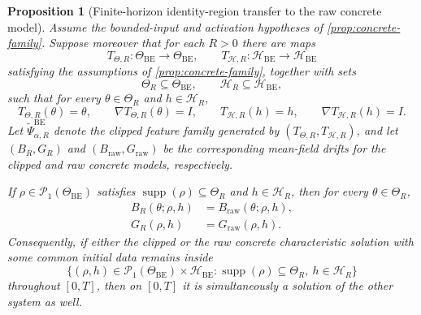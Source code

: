 \documentclass[11pt]{article}
\newtheorem{proposition}[theorem]{Proposition}
\theoremstyle{definition}
\newcommand{\PP}{\mathcal{P}}
\begin{document}
\begin{proposition}[Finite-horizon identity-region transfer to the raw concrete model]
\label{prop:identity-transfer}
Assume the bounded-input and activation hypotheses of
\cref{prop:concrete-family}. Suppose moreover that for each $R>0$ there are
maps
\[
  T_{\Theta,R}:\Theta_{\mathrm{BE}}\to\Theta_{\mathrm{BE}},
  \qquad
  T_{\mathcal H,R}:\mathcal H_{\mathrm{BE}}\to\mathcal H_{\mathrm{BE}}
\]
satisfying the assumptions of \cref{prop:concrete-family}, together with sets
\[
  \Theta_R\subseteq\Theta_{\mathrm{BE}},
  \qquad
  \mathcal H_R\subseteq\mathcal H_{\mathrm{BE}},
\]
such that for every $\theta\in\Theta_R$ and $h\in\mathcal H_R$,
\[
  T_{\Theta,R}(\theta)=\theta,
  \qquad
  \nabla T_{\Theta,R}(\theta)=I,
  \qquad
  T_{\mathcal H,R}(h)=h,
  \qquad
  \nabla T_{\mathcal H,R}(h)=I.
\]
Let $\widetilde\Psi_{\alpha,R}^{\mathrm{BE}}$ denote the clipped feature family
generated by $(T_{\Theta,R},T_{\mathcal H,R})$, and let
$(B_R,G_R)$ and $(B_{\mathrm{raw}},G_{\mathrm{raw}})$ be the corresponding
mean-field drifts for the clipped and raw concrete models, respectively.

If $\rho\in\PP_1(\Theta_{\mathrm{BE}})$ satisfies $\operatorname{supp}(\rho)\subseteq\Theta_R$
and $h\in\mathcal H_R$, then for every $\theta\in\Theta_R$,
\begin{align}
  B_R(\theta;\rho,h)
  &= B_{\mathrm{raw}}(\theta;\rho,h),
  \label{eq:transfer-B}\\
  G_R(\rho,h)
  &= G_{\mathrm{raw}}(\rho,h).
  \label{eq:transfer-G}
\end{align}
Consequently, if either the clipped or the raw concrete characteristic
solution with some common initial data remains inside
\[
  \bigl\{
    (\rho,h)\in\PP_1(\Theta_{\mathrm{BE}})\times\mathcal H_{\mathrm{BE}}
    :
    \operatorname{supp}(\rho)\subseteq\Theta_R,\ h\in\mathcal H_R
  \bigr\}
\]
throughout $[0,T]$, then on $[0,T]$ it is simultaneously a solution of the
other system as well.
\end{proposition}
\end{document}
